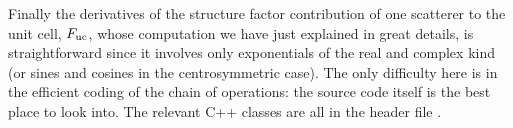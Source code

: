 \documentclass[11pt]{article}
\begin{document}
Finally the derivatives of the structure factor contribution of one scatterer to the unit cell, $F_{\text{uc}}$, whose computation we have just explained in great details, is straightforward since it involves only exponentials of the real and complex kind (or sines and cosines in the centrosymmetric case). The only difficulty here is in the efficient coding of the chain of operations: the source code itself is the best place to look into. The relevant C++ classes are all in the header file .


\end{document}
